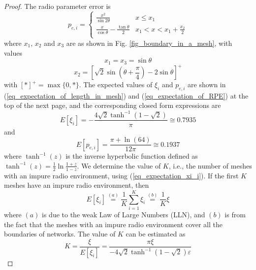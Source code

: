 \documentclass[conference]{IEEEtran}
\begin{document}
\begin{proof}
The radio parameter error is
\begin{equation}
{p_{e,i}} = \left\{ {\begin{array}{*{20}{c}}
   {\frac{{{x^2}}}{{\sin 2\theta }}} & {x \le {x_1}}  \\
   {\frac{x}{{\cos \theta }} - \frac{{\tan \theta }}{2}} & {{x_1} < x < {x_1} + \frac{{{x_2}}}{2}}  \\
\end{array}} \right.
\end{equation}
where $x_1$, $x_2$ and $x_3$ are as shown in Fig. \ref{fig_boundary_in_a_mesh},
with values
\begin{equation}
{x_1} = {x_3} = \sin \theta
\end{equation}
\begin{equation}
{x_2} = {\left[ {\sqrt 2 \sin \left( {\theta  + \frac{\pi }{4}} \right) - 2\sin \theta } \right]^ + }
\end{equation}
with ${[*]^ + } = \max \{ 0,*\}$.
The expected values of $\xi_i$ and $p_{e,i}$ are shown in (\ref{eq_expectation_of_length_in_mesh}) and (\ref{eq_expectation_of_RPE})
at the top of the next page, and the corresponding closed form expressions are
\begin{equation}\label{eq_expectation_xi_i}
E[{\xi _i}] =  - \frac{{4\sqrt 2 {{\tanh }^{ - 1}}(1 - \sqrt 2 )}}{\pi } \cong 0.7935
\end{equation}
and
\begin{equation}\label{eq_expectation_pei}
E[{p_{e,i}}] = \frac{{\pi  + \ln (64)}}{{12\pi }} \cong 0.1937
\end{equation}
where ${\tanh ^{ - 1}}(z)$ is the inverse hyperbolic function defined as ${\tanh ^{ - 1}}(z) = \frac{1}{2}\ln \frac{{1 + z}}{{1 - z}}$.
We determine the value of $K$, i.e., the number of meshes with an impure radio environment, using (\ref{eq_expectation_xi_i}).
If the first $K$ meshes have an impure radio environment, then
\begin{equation}
E[{\xi _i}]\mathop  = \limits^{(a)} \frac{1}{K}\sum\limits_{i = 1}^K {{\xi _i}} \mathop  = \limits^{(b)} \frac{1}{K}\xi
\end{equation}
where $(a)$ is due to the weak Law of Large Numbers (LLN), and $(b)$ is from the fact that the meshes with an impure radio environment cover all the boundaries of networks.
The value of $K$ can be estimated as
\begin{equation}\label{eq_estimation_K}
K = \frac{\xi }{{E[{\xi _i}]}} = \frac{{\pi \xi }}{{ - 4\sqrt 2 {{\tanh }^{ - 1}}(1 - \sqrt 2 )\varepsilon }}
\end{equation}


\end{proof}
\end{document}
